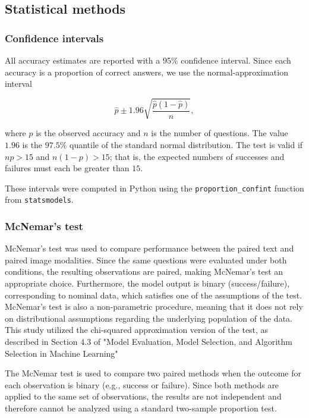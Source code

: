 \documentclass{article}
\begin{document}
\subsection{Statistical methods}

\subsubsection{Confidence intervals}

All accuracy estimates are reported with a 95\% confidence interval. Since each accuracy is a proportion of correct answers, we use the normal-approximation interval

$$\hat{p} \pm 1.96\sqrt{\frac{\hat{p}(1-\hat{p})}{n}},$$

where $\hat{p}$ is the observed accuracy and $n$ is the number of questions. The value $1.96$ is the $97.5\%$ quantile of the standard normal distribution. The test is valid if $np > 15$ and $n(1-p) > 15$; that is, the expected numbers of successes and failures must each be greater than $15$.

These intervals were computed in Python using the \texttt{proportion\_confint} function from \texttt{statsmodels}.

\subsubsection{McNemar's test}

McNemar's test was used to compare performance between the paired text and paired image modalities. Since the same questions were evaluated under both conditions, the resulting observations are paired, making McNemar's test an appropriate choice. Furthermore, the model output is binary (success/failure), corresponding to nominal data, which satisfies one of the assumptions of the test. McNemar's test is also a non-parametric procedure, meaning that it does not rely on distributional assumptions regarding the underlying population of the data. This study utilized the chi-squared approximation version of the test, as described in Section 4.3 of "Model Evaluation, Model Selection, and Algorithm Selection in Machine Learning"\supercite{raschka2018model}

The McNemar test is used to compare two paired methods when the outcome for each observation is binary (e.g., success or failure). Since both methods are applied to the same set of observations, the results are not independent and therefore cannot be analyzed using a standard two-sample proportion test. 
\end{document}
